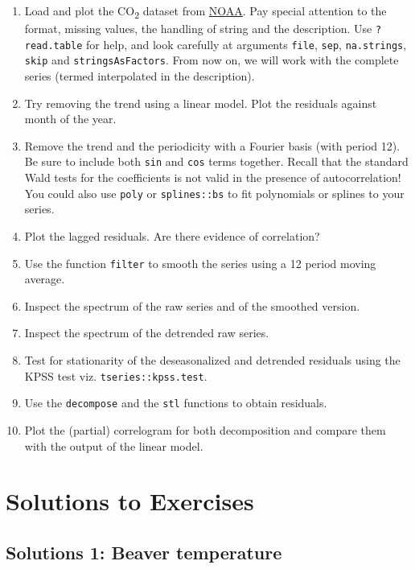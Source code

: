 \documentclass[]{book}
\providecommand{\tightlist}{%
  \setlength{\itemsep}{0pt}\setlength{\parskip}{0pt}}
\begin{document}
\begin{enumerate}
\def\labelenumi{\arabic{enumi}.}
\tightlist
\item
  Load and plot the CO\textsubscript{2} dataset from
  \href{ftp://aftp.cmdl.noaa.gov/products/trends/co2/co2_mm_mlo.txt}{NOAA}.
  Pay special attention to the format, missing values, the handling of
  string and the description. Use \texttt{?read.table} for help, and
  look carefully at arguments \texttt{file}, \texttt{sep},
  \texttt{na.strings}, \texttt{skip} and \texttt{stringsAsFactors}. From
  now on, we will work with the complete series (termed interpolated in
  the description).
\item
  Try removing the trend using a linear model. Plot the residuals
  against month of the year.
\item
  Remove the trend and the periodicity with a Fourier basis (with period
  12). Be sure to include both \texttt{sin} and \texttt{cos} terms
  together. Recall that the standard Wald tests for the coefficients is
  not valid in the presence of autocorrelation! You could also use
  \texttt{poly} or \texttt{splines::bs} to fit polynomials or splines to
  your series.
\item
  Plot the lagged residuals. Are there evidence of correlation?
\item
  Use the function \texttt{filter} to smooth the series using a 12
  period moving average.
\item
  Inspect the spectrum of the raw series and of the smoothed version.
\item
  Inspect the spectrum of the detrended raw series.
\item
  Test for stationarity of the deseasonalized and detrended residuals
  using the KPSS test viz. \texttt{tseries::kpss.test}.
\item
  Use the \texttt{decompose} and the \texttt{stl} functions to obtain
  residuals.
\item
  Plot the (partial) correlogram for both decomposition and compare them
  with the output of the linear model.
\end{enumerate}

\hypertarget{solutions-to-exercises}{%
\section{Solutions to Exercises}\label{solutions-to-exercises}}

\hypertarget{solutions-1-beaver-temperature}{%
\subsection{Solutions 1: Beaver
temperature}\label{solutions-1-beaver-temperature}}
\end{document}
